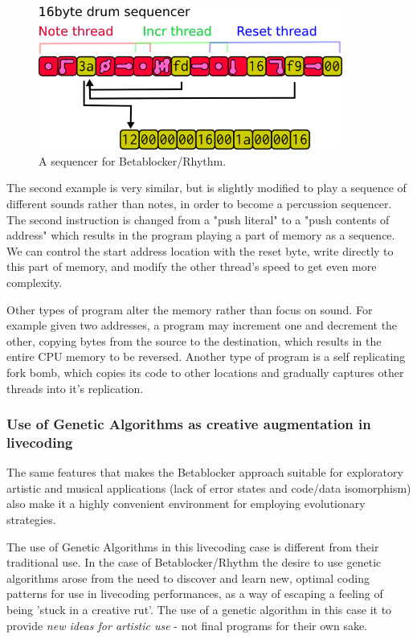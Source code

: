 \documentclass[letterpaper, 12pt]{article}
\begin{document}
\begin{figure}[H]
	\centering
		\includegraphics[width=10cm]{bbds-seq}
	\caption{A sequencer for Betablocker/Rhythm.}
	\label{fig:fig_bbds-seq}
\end{figure}

The second example is very similar, but is slightly modified to play a sequence of different sounds rather than notes, in order to become a percussion sequencer. The second instruction is changed from a "push literal" to a "push contents of address" which results in the program playing a part of memory as a sequence. We can control the start address location with the reset byte, write directly to this part of memory, and modify the other thread's speed to get even more complexity.

Other types of program alter the memory rather than focus on sound. 
For example given two addresses, a program may increment one and decrement the other, copying bytes from the source to the destination, which results in the entire CPU memory to be reversed. 
Another type of program is a self replicating fork bomb, which copies its code to other locations and gradually captures other threads into it's replication.
\parskip 18pt

\subsubsection{Use of Genetic Algorithms as creative augmentation in livecoding} %
\label{sub:genetic_programming}

The same features that makes the Betablocker approach suitable for exploratory artistic and musical applications (lack of error states and code/data isomorphism) also make it a highly convenient environment for employing evolutionary strategies.

The use of Genetic Algorithms \citep{barricelli1963numerical} in this livecoding case is different from their traditional use. In the case of Betablocker/Rhythm the desire to use genetic algorithms arose from the need to discover and learn new, optimal coding patterns for use in livecoding performances, as a way of escaping a feeling of being 'stuck in a creative rut'. The use of a genetic algorithm in this case it to provide \emph{new ideas for artistic use} - not final programs for their own sake.
\end{document}
